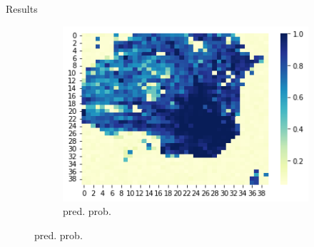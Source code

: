 \documentclass[10pt]{beamer}
\begin{document}
\begin{frame}{Results}
\begin{figure}[!htb]
{\begin{subfigure}{0.32\textwidth}
        \centering
        \includegraphics[width=1\linewidth, height=0.3\textheight]{pred_prob.png}
        \caption{pred. prob.}
    \end{subfigure}
    
}
\end{figure}
\end{frame}
\end{document}
